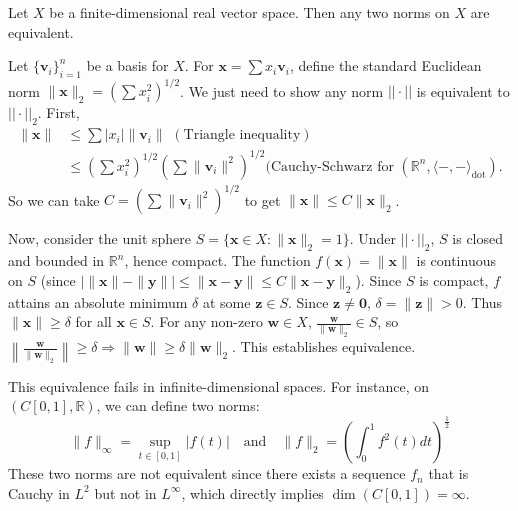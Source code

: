 \begin{theorem}
Let $X$ be a finite-dimensional real vector space. Then any two norms on $X$ are equivalent.
\end{theorem}
\begin{pfbox}
Let $\{\mathbf{v}_i\}_{i=1}^n$ be a basis for $X$. For $\mathbf{x} = \displaystyle\sum x_i \mathbf{v}_i$, define the standard Euclidean norm $\|\mathbf{x}\|_2 = \left(\displaystyle\sum x_i^2\right)^{1/2}$. We just need to show any norm $||\cdot||$ is equivalent to $||\cdot||_2$.
First, 
\begin{align*}
\|\mathbf{x}\| &\le \displaystyle\sum |x_i|\|\mathbf{v}_i\|\,\,(\text{Triangle inequality})\\
&\le \left(\displaystyle\sum x_i^2\right)^{1/2} \left(\displaystyle\sum \|\mathbf{v}_i\|^2\right)^{1/2} (\text{Cauchy-Schwarz for } (\mathbb{R}^n, \langle-,-\rangle_{\text{dot}}).
\end{align*}
So we can take $C = \left(\displaystyle\sum \|\mathbf{v}_i\|^2\right)^{1/2}$ to get $\|\mathbf{x}\| \le C \|\mathbf{x}\|_2$.

Now, consider the unit sphere $S = \{\mathbf{x} \in X : \|\mathbf{x}\|_2 = 1\}$. Under $||\cdot||_2$, $S$ is closed and bounded in $\mathbb{R}^n$, hence compact. The function $f(\mathbf{x}) = \|\mathbf{x}\|$ is continuous on $S$ (since $\left| \|\mathbf{x}\| - \|\mathbf{y}\| \right| \le \|\mathbf{x}-\mathbf{y}\| \le C \|\mathbf{x}-\mathbf{y}\|_2$). 
Since $S$ is compact, $f$ attains an absolute minimum $\delta$ at some $\mathbf{z} \in S$. Since $\mathbf{z} \ne \mathbf{0}$, $\delta = \|\mathbf{z}\| > 0$.
Thus $\|\mathbf{x}\| \ge \delta$ for all $\mathbf{x} \in S$. For any non-zero $\mathbf{w} \in X$, $\frac{\mathbf{w}}{\|\mathbf{w}\|_2} \in S$, so $\left\|\frac{\mathbf{w}}{\|\mathbf{w}\|_2}\right\| \ge \delta \Rightarrow \|\mathbf{w}\| \ge \delta \|\mathbf{w}\|_2$. This establishes equivalence.
\end{pfbox}


\begin{remark}
    This equivalence fails in infinite-dimensional spaces. For instance, on $(C[0,1], \mathbb{R})$, we can define two norms:
    \[ \|f\|_\infty = \sup_{t \in [0,1]} |f(t)| \quad \text{and} \quad \|f\|_2 = \left( \int_0^1 f^2(t) dt \right)^{\frac{1}{2}} \]
    These two norms are not equivalent since there exists a sequence $f_n$ that is Cauchy in $L^2$ but not in $L^\infty$, which directly implies $\dim(C[0,1]) = \infty$.
\end{remark}

